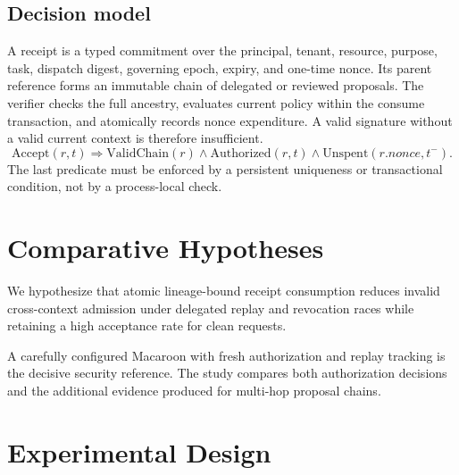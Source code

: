 \documentclass[11pt,a4paper]{article}
\begin{document}
\subsection{Decision model}
A receipt is a typed commitment over the principal, tenant, resource, purpose, task, dispatch digest, governing epoch, expiry, and one-time nonce. Its parent reference forms an immutable chain of delegated or reviewed proposals. The verifier checks the full ancestry, evaluates current policy within the consume transaction, and atomically records nonce expenditure. A valid signature without a valid current context is therefore insufficient.
\begin{equation}
\mathrm{Accept}(r,t)\Rightarrow
\mathrm{ValidChain}(r)\land\mathrm{Authorized}(r,t)\land
\mathrm{Unspent}(r.nonce,t^-).
\end{equation}
The last predicate must be enforced by a persistent uniqueness or transactional condition, not by a process-local check.

\section{Comparative Hypotheses}
We hypothesize that atomic lineage-bound receipt consumption reduces invalid cross-context admission under delegated replay and revocation races while retaining a high acceptance rate for clean requests.

A carefully configured Macaroon with fresh authorization and replay tracking is the decisive security reference. The study compares both authorization decisions and the additional evidence produced for multi-hop proposal chains.

\section{Experimental Design}
\end{document}
